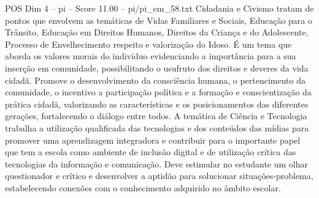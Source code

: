 \begin{textsample}{POS Dim 4 – pi – Score 11.00 – pi/pi\_em\_58.txt}
Cidadania e Civismo tratam de pontos que envolvem as temáticas de Vidas Familiares e Sociais, Educação para o Trânsito, Educação em Direitos Humanos, Direitos da Criança e do Adolescente, Processo de Envelhecimento respeito e valorização do Idoso.
É um tema que aborda os valores morais do indivíduo evidenciando a importância para a sua inserção em comunidade, possibilitando o usufruto dos direitos e deveres da vida cidadã.
Promove o desenvolvimento da consciência humana, o pertencimento da comunidade, o incentivo a participação política e a formação e conscientização da prática cidadã, valorizando as características e os posicionamentos das diferentes gerações, fortalecendo o diálogo entre todos.
A temática de Ciência e Tecnologia trabalha a utilização qualificada das tecnologias e dos conteúdos das mídias para promover uma aprendizagem integradora e contribuir para o importante papel que tem a escola como ambiente de inclusão digital e de utilização crítica das tecnologias da informação e comunicação.
Deve estimular no estudante um olhar questionador e crítico e desenvolver a aptidão para solucionar situações-problema, estabelecendo conexões com o conhecimento adquirido no âmbito escolar.

\end{textsample}
